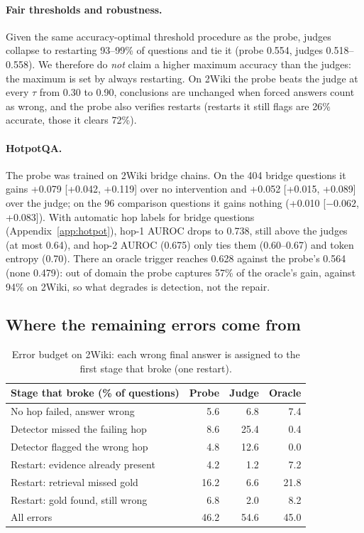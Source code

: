 \documentclass[11pt]{article}
\begin{document}
\paragraph{Fair thresholds and robustness.} Given the same accuracy-optimal threshold procedure as the probe, judges collapse to restarting 93--99\% of questions and tie it (probe 0.554, judges 0.518--0.558). We therefore do \emph{not} claim a higher maximum accuracy than the judges: the maximum is set by always restarting. On 2Wiki the probe beats the judge at every $\tau$ from 0.30 to 0.90, conclusions are unchanged when forced answers count as wrong, and the probe also verifies restarts (restarts it still flags are 26\% accurate, those it clears 72\%).

\paragraph{HotpotQA.} The probe was trained on 2Wiki bridge chains. On the 404 bridge questions it gains +0.079 [+0.042, +0.119] over no intervention and +0.052 [+0.015, +0.089] over the judge; on the 96 comparison questions it gains nothing (+0.010 [$-0.062$, +0.083]). With automatic hop labels for bridge questions (Appendix~\ref{app:hotpot}), hop-1 AUROC drops to 0.738, still above the judges (at most 0.64), and hop-2 AUROC (0.675) only ties them (0.60--0.67) and token entropy (0.70). There an oracle trigger reaches 0.628 against the probe's 0.564 (none 0.479): out of domain the probe captures 57\% of the oracle's gain, against 94\% on 2Wiki, so what degrades is detection, not the repair.

\subsection{Where the remaining errors come from}

\begin{table}[t]
\centering\small
\begin{tabular}{lrrr}
\toprule
Stage that broke (\% of questions) & Probe & Judge & Oracle \\
\midrule
No hop failed, answer wrong & 5.6 & 6.8 & 7.4 \\
Detector missed the failing hop & 8.6 & 25.4 & 0.4 \\
Detector flagged the wrong hop & 4.8 & 12.6 & 0.0 \\
Restart: evidence already present & 4.2 & 1.2 & 7.2 \\
Restart: retrieval missed gold & 16.2 & 6.6 & 21.8 \\
Restart: gold found, still wrong & 6.8 & 2.0 & 8.2 \\
\midrule
All errors & 46.2 & 54.6 & 45.0 \\
\bottomrule
\end{tabular}
\caption{Error budget on 2Wiki: each wrong final answer is assigned to the first stage that broke (one restart).}
\label{tab:budget}
\end{table}
\end{document}
